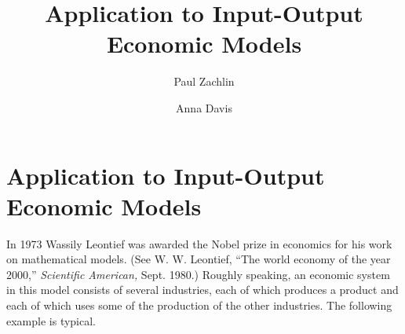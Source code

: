 \documentclass{ximera}
\author{Paul Zachlin \and Anna Davis} \title{Application to Input-Output Economic Models} \license{CC-BY 4.0}
\begin{document}
\begin{abstract}
\end{abstract}
\maketitle

\section*{Application to Input-Output Economic Models}
In 1973 Wassily Leontief was awarded the Nobel prize in economics for his work on mathematical models.  (See W. W. Leontief, ``The world economy of the year 2000,'' \textit{Scientific American,} Sept. 1980.) Roughly speaking, an economic system in this model consists of several industries, each of which produces a product and each of which uses some of the production of the other industries. The following example is typical.
\end{document}
